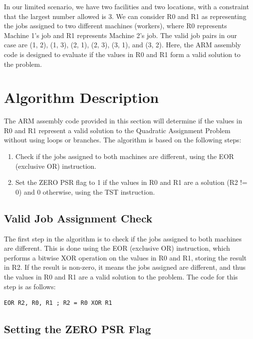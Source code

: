 In our limited scenario, we have two facilities and two locations, with a constraint that the largest number allowed is 3. We can consider R0 and R1 as representing the jobs assigned to two different machines (workers), where R0 represents Machine 1's job and R1 represents Machine 2's job. The valid job pairs in our case are (1, 2), (1, 3), (2, 1), (2, 3), (3, 1), and (3, 2). Here, the ARM assembly code is designed to evaluate if the values in R0 and R1 form a valid solution to the problem.

\section{Algorithm Description}

The ARM assembly code provided in this section will determine if the values in R0 and R1 represent a valid solution to the Quadratic Assignment Problem without using loops or branches. The algorithm is based on the following steps:

\begin{enumerate}
    \item Check if the jobs assigned to both machines are different, using the EOR (exclusive OR) instruction.
    \item Set the ZERO PSR flag to 1 if the values in R0 and R1 are a solution (R2 != 0) and 0 otherwise, using the TST instruction.
\end{enumerate}

\subsection{Valid Job Assignment Check}

The first step in the algorithm is to check if the jobs assigned to both machines are different. This is done using the EOR (exclusive OR) instruction, which performs a bitwise XOR operation on the values in R0 and R1, storing the result in R2. If the result is non-zero, it means the jobs assigned are different, and thus the values in R0 and R1 are a valid solution to the problem. The code for this step is as follows:

\begin{verbatim}
EOR R2, R0, R1 ; R2 = R0 XOR R1
\end{verbatim}

\subsection{Setting the ZERO PSR Flag}

